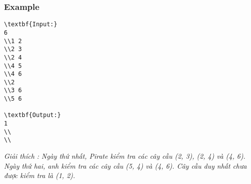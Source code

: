 \subsubsection{   Example  }
\begin{verbatim}
\textbf{Input:}
6
\\1 2
\\2 3
\\2 4
\\4 5
\\4 6
\\2
\\3 6
\\5 6

\textbf{Output:}
1
\\
\\\end{verbatim}

\emph{     Giải thích        : Ngày thứ nhất, Pirate kiểm tra các cây cầu (2, 3), (2, 4) và (4, 6). Ngày thứ hai, anh kiểm tra các cây cầu (5, 4) và (4, 6). Cây cầu duy nhất chưa được kiểm tra là (1, 2).   }